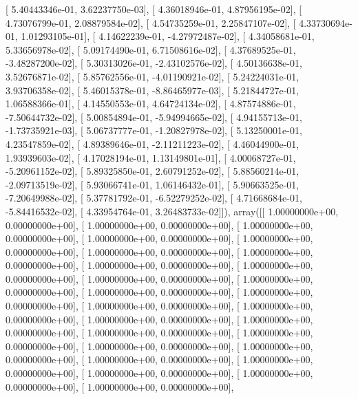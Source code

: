 \documentclass{article}
\begin{document}
       [  5.40443346e-01,   3.62237750e-03],
       [  4.36018946e-01,   4.87956195e-02],
       [  4.73076799e-01,   2.08879584e-02],
       [  4.54735259e-01,   2.25847107e-02],
       [  4.33730694e-01,   1.01293105e-01],
       [  4.14622239e-01,  -4.27972487e-02],
       [  4.34058681e-01,   5.33656978e-02],
       [  5.09174490e-01,   6.71508616e-02],
       [  4.37689525e-01,  -3.48287200e-02],
       [  5.30313026e-01,  -2.43102576e-02],
       [  4.50136638e-01,   3.52676871e-02],
       [  5.85762556e-01,  -4.01190921e-02],
       [  5.24224031e-01,   3.93706358e-02],
       [  5.46015378e-01,  -8.86465977e-03],
       [  5.21844727e-01,   1.06588366e-01],
       [  4.14550553e-01,   4.64724134e-02],
       [  4.87574886e-01,  -7.50644732e-02],
       [  5.00854894e-01,  -5.94994665e-02],
       [  4.94155713e-01,  -1.73735921e-03],
       [  5.06737777e-01,  -1.20827978e-02],
       [  5.13250001e-01,   4.23547859e-02],
       [  4.89389646e-01,  -2.11211223e-02],
       [  4.46044900e-01,   1.93939603e-02],
       [  4.17028194e-01,   1.13149801e-01],
       [  4.00068727e-01,  -5.20961152e-02],
       [  5.89325850e-01,   2.60791252e-02],
       [  5.88560214e-01,  -2.09713519e-02],
       [  5.93066741e-01,   1.06146432e-01],
       [  5.90663525e-01,  -7.20649988e-02],
       [  5.37781792e-01,  -6.52279252e-02],
       [  4.71668684e-01,  -5.84416532e-02],
       [  4.33954764e-01,   3.26483733e-02]]), array([[  1.00000000e+00,   0.00000000e+00],
       [  1.00000000e+00,   0.00000000e+00],
       [  1.00000000e+00,   0.00000000e+00],
       [  1.00000000e+00,   0.00000000e+00],
       [  1.00000000e+00,   0.00000000e+00],
       [  1.00000000e+00,   0.00000000e+00],
       [  1.00000000e+00,   0.00000000e+00],
       [  1.00000000e+00,   0.00000000e+00],
       [  1.00000000e+00,   0.00000000e+00],
       [  1.00000000e+00,   0.00000000e+00],
       [  1.00000000e+00,   0.00000000e+00],
       [  1.00000000e+00,   0.00000000e+00],
       [  1.00000000e+00,   0.00000000e+00],
       [  1.00000000e+00,   0.00000000e+00],
       [  1.00000000e+00,   0.00000000e+00],
       [  1.00000000e+00,   0.00000000e+00],
       [  1.00000000e+00,   0.00000000e+00],
       [  1.00000000e+00,   0.00000000e+00],
       [  1.00000000e+00,   0.00000000e+00],
       [  1.00000000e+00,   0.00000000e+00],
       [  1.00000000e+00,   0.00000000e+00],
       [  1.00000000e+00,   0.00000000e+00],
       [  1.00000000e+00,   0.00000000e+00],
       [  1.00000000e+00,   0.00000000e+00],
       [  1.00000000e+00,   0.00000000e+00],
       [  1.00000000e+00,   0.00000000e+00],
\end{document}
